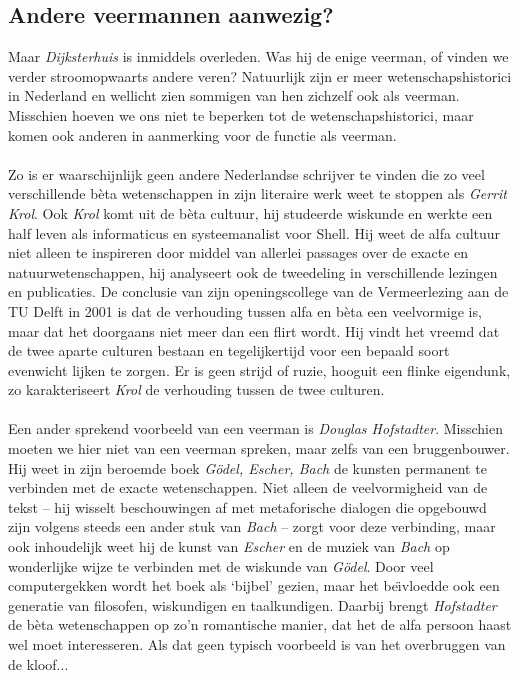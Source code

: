 \subsection{Andere veermannen aanwezig?}

Maar \emph{Dijksterhuis} is inmiddels overleden. Was hij de enige veerman, of vinden we verder stroomopwaarts andere veren? Natuurlijk zijn er meer wetenschapshistorici in Nederland en wellicht zien sommigen van hen zichzelf ook als veerman. Misschien hoeven we ons niet te beperken tot de wetenschapshistorici, maar komen ook anderen in aanmerking voor de functie als veerman.

\paragraph{}

Zo is er waarschijnlijk geen andere Nederlandse schrijver te vinden die zo veel verschillende b\`eta wetenschappen in zijn literaire werk weet te stoppen als \emph{Gerrit Krol}. Ook \emph{Krol} komt uit de b\`eta cultuur, hij studeerde wiskunde en werkte een half leven als informaticus en systeemanalist voor Shell. Hij weet de alfa cultuur niet alleen te inspireren door middel van allerlei passages over de exacte en natuurwetenschappen, hij analyseert ook de tweedeling in verschillende lezingen en publicaties. De conclusie van zijn openingscollege van de Vermeerlezing aan de TU Delft in 2001 is dat de verhouding tussen alfa en b\`eta een veelvormige is, maar dat het doorgaans niet meer dan een flirt wordt. Hij vindt het vreemd dat de twee aparte culturen bestaan en tegelijkertijd voor een bepaald soort evenwicht lijken te zorgen. Er is geen strijd of ruzie, hooguit een flinke eigendunk, zo karakteriseert \emph{Krol} de verhouding tussen de twee culturen.

\paragraph{}

Een ander sprekend voorbeeld van een veerman is \emph{Douglas Hofstadter}. Misschien moeten we hier niet van een veerman spreken, maar zelfs van een bruggenbouwer. Hij weet in zijn beroemde boek \emph{G\"odel, Escher, Bach} de kunsten permanent te verbinden met de exacte wetenschappen. Niet alleen de veelvormigheid van de tekst -- hij wisselt beschouwingen af met metaforische dialogen die opgebouwd zijn volgens steeds een ander stuk van \emph{Bach} -- zorgt voor deze verbinding, maar ook inhoudelijk weet hij de kunst van \emph{Escher} en de muziek van \emph{Bach} op wonderlijke wijze te verbinden met de wiskunde van \emph{G\"odel}. Door veel computergekken wordt het boek als `bijbel' gezien, maar het be\"\i{}vloedde ook een generatie van filosofen, wiskundigen en taalkundigen. Daarbij brengt \emph{Hofstadter} de b\`eta wetenschappen op zo'n romantische manier, dat het de alfa persoon haast wel moet interesseren. Als dat geen typisch voorbeeld is van het overbruggen van de kloof...

